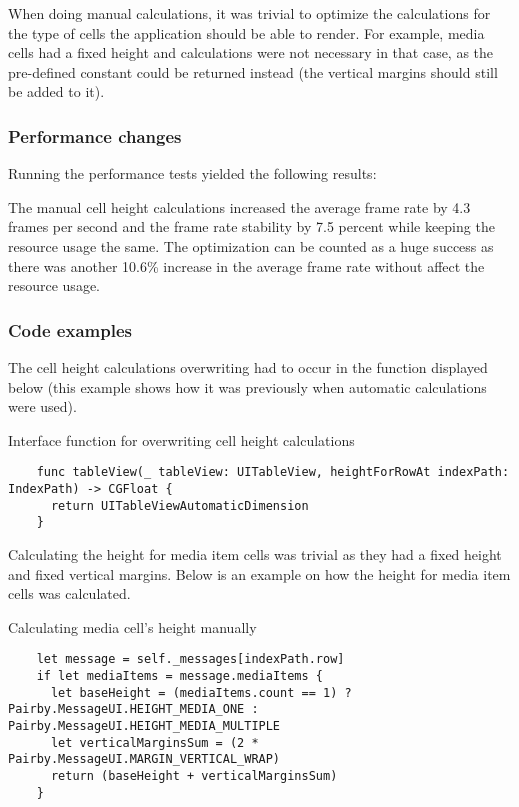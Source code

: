 \documentclass[a4paper,12pt]{article}
\begin{document}
When doing manual calculations, it was trivial to optimize the calculations for the type of cells the application should be able to render. For example, media cells had a fixed height and calculations were not necessary in that case, as the pre-defined constant could be returned instead (the vertical margins should still be added to it).

\subsubsection*{Performance changes}
Running the performance tests yielded the following results:

The manual cell height calculations increased the average frame rate by 4.3 frames per second and the frame rate stability by 7.5 percent while keeping the resource usage the same. The optimization can be counted as a huge success as there was another 10.6\% increase in the average frame rate without affect the resource usage. 

\subsubsection*{Code examples}
The cell height calculations overwriting had to occur in the function displayed below (this example shows how it was previously when automatic calculations were used).
\begin{listing}[H]
  \caption{Interface function for overwriting cell height calculations}
  \begin{verbatim}
    func tableView(_ tableView: UITableView, heightForRowAt indexPath: IndexPath) -> CGFloat {
      return UITableViewAutomaticDimension
    }
  \end{verbatim}
\end{listing}

Calculating the height for media item cells was trivial as they had a fixed height and fixed vertical margins. Below is an example on how the height for media item cells was calculated.
\begin{listing}[H]
  \caption{Calculating media cell's height manually}
  \begin{verbatim}
    let message = self._messages[indexPath.row]
    if let mediaItems = message.mediaItems {
      let baseHeight = (mediaItems.count == 1) ? Pairby.MessageUI.HEIGHT_MEDIA_ONE : Pairby.MessageUI.HEIGHT_MEDIA_MULTIPLE
      let verticalMarginsSum = (2 * Pairby.MessageUI.MARGIN_VERTICAL_WRAP)
      return (baseHeight + verticalMarginsSum)
    }
  \end{verbatim}
\end{listing}
\end{document}
